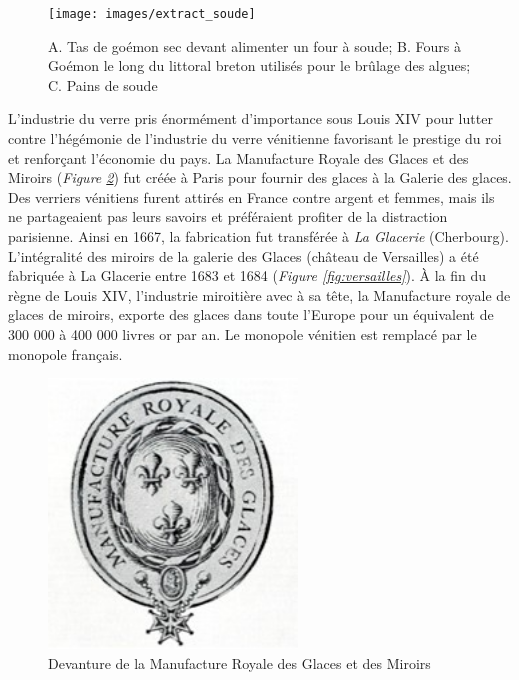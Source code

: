 \documentclass[
]{book}
\begin{document}
\begin{figure}

{\centering \texttt{[image: images/extract\_soude]} 

}

\caption{A. Tas de goémon sec devant alimenter un four à soude; B. Fours à Goémon le long du littoral breton utilisés pour le brûlage des algues; C. Pains de soude}\label{fig:soude}
\end{figure}

L'industrie du verre pris énormément d'importance sous Louis XIV pour lutter contre l'hégémonie de l'industrie du verre vénitienne favorisant le prestige du roi et renforçant l'économie du pays.
La Manufacture Royale des Glaces et des Miroirs (\emph{Figure \ref{fig:manufacture}}) fut créée à Paris pour fournir des glaces à la Galerie des glaces. Des verriers vénitiens furent attirés en France contre argent et femmes, mais ils ne partageaient pas leurs savoirs et préféraient profiter de la distraction parisienne. Ainsi en 1667, la fabrication fut transférée à \emph{La Glacerie} (Cherbourg). L'intégralité des miroirs de la galerie des Glaces (château de Versailles) a été fabriquée à La Glacerie entre 1683 et 1684 (\emph{Figure \ref{fig:versailles}}).
À la fin du règne de Louis XIV, l'industrie miroitière avec à sa tête, la Manufacture royale de glaces de miroirs, exporte des glaces dans toute l'Europe pour un équivalent de 300 000 à 400 000 livres or par an. Le monopole vénitien est remplacé par le monopole français.

\begin{figure}

{\centering \includegraphics[width=2.6in]{images/manufacture_royale} 

}

\caption{Devanture de la Manufacture Royale des Glaces et des Miroirs}\label{fig:manufacture}
\end{figure}
\end{document}
